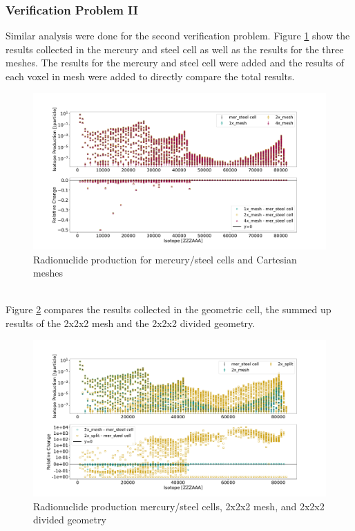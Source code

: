 
\newpage

\subsubsection{Verification Problem II}
Similar analysis were done for the second verification problem. Figure
\ref{fig:2prod_cell_1x_2x_4x} show the results collected in the mercury and
steel cell as well as the results for the three meshes. The results for the
mercury and steel cell were added and the results of each voxel in mesh were
added to directly compare the total results.
%
\begin{figure}[h!]
 \centering
 \includegraphics[scale=0.42,trim={2cm 1cm 3cm 2cm},clip]{../figs/toy_p2/prod_VPII_1x_2x_4x.pdf}
 \caption{Radionuclide production for mercury/steel cells and Cartesian meshes}
 \label{fig:2prod_cell_1x_2x_4x}
\end{figure}
%
\\
Figure \ref{fig:2prod_cell_2x} compares the results collected in the geometric
cell, the summed up results of the 2x2x2 mesh and the 2x2x2 divided geometry.
%
\begin{figure}[h!]
 \centering
 \includegraphics[scale=0.42,trim={2cm 1cm 3cm 2cm},clip]{../figs/toy_p2/prod_VPII_2x.pdf}
 \caption{Radionuclide production mercury/steel cells, 2x2x2 mesh, and 2x2x2 divided geometry}
 \label{fig:2prod_cell_2x}
\end{figure}

